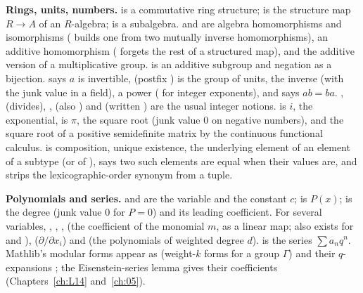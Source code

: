 \textbf{Rings, units, numbers.}  is a commutative ring structure; 
is the structure map $R\to A$ of an $R$-algebra;  is a subalgebra. 
and  are algebra homomorphisms and isomorphisms ( builds one from
two mutually inverse homomorphisms),  an additive homomorphism (
forgets the rest of a structured map), and  the additive version of a multiplicative
group.  is an additive subgroup and  negation as a bijection.
 says $a$ is invertible,  (postfix ) is the group of units,  the inverse (with the
junk value  in a field),  a power ( for integer exponents), and
 says $ab = ba$. ,  (divides), ,
 (also ) and  (written ) are the usual
integer notions.  is $i$,  the exponential,  is $\pi$,
 the square root (junk value $0$ on negative numbers), and  the square root
of a positive semidefinite matrix by the continuous functional calculus.  is composition,
 unique existence,  the underlying element of an element of a subtype (or of
),  says two such elements are equal when their values are, and
 strips the lexicographic-order synonym from a tuple.

\textbf{Polynomials and series.}  and  are the variable and the
constant $c$;  is $P(x)$;  is the degree (junk value $0$ for
$P = 0$) and  its leading coefficient. For several variables, ,
, ,  (the coefficient of the
monomial $m$, as a linear map;  also exists for  and ),
 ($\partial/\partial x_i$) and
 (the polynomials of weighted degree $d$).
 is the series $\sum a_nq^n$. Mathlib's modular forms appear as
 (weight-$k$ forms for a group $\Gamma$) and their $q$-expansions
; the Eisenstein-series lemma  gives their
coefficients (Chapters~\ref{ch:L14} and~\ref{ch:05}).

